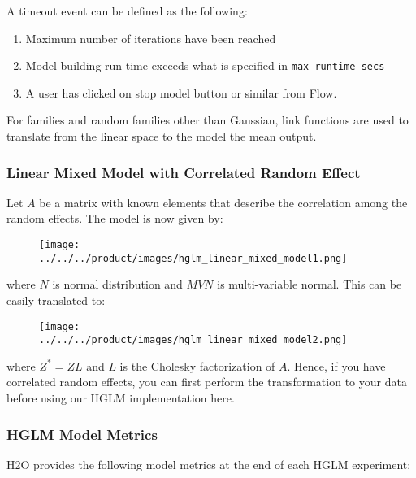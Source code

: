 A timeout event can be defined as the following:

\begin{enumerate}
    \item Maximum number of iterations have been reached
    \item Model building run time exceeds what is specified in \texttt{max\_runtime\_secs}
    \item A user has clicked on stop model button or similar from Flow.
\end{enumerate}

For families and random families other than Gaussian, link functions are used to translate from the linear space to the model the mean output.

\subsubsection{Linear Mixed Model with Correlated Random Effect}

Let $A$ be a matrix with known elements that describe the correlation among the random effects. The model is now given by:

\begin{figure}[H]
\centering
\texttt{[image: ../../../product/images/hglm\_linear\_mixed\_model1.png]}
\end{figure}

where $N$ is normal distribution and $MVN$ is multi-variable normal. This can be easily translated to:

\begin{figure}[H]
\centering
\texttt{[image: ../../../product/images/hglm\_linear\_mixed\_model2.png]}
\end{figure}

where $Z^* = ZL$ and $L$ is the Cholesky factorization of $A$. Hence, if you have correlated random effects, you can first perform the transformation to your data before using our HGLM implementation here.

\subsubsection{HGLM Model Metrics}

H2O provides the following model metrics at the end of each HGLM experiment:

